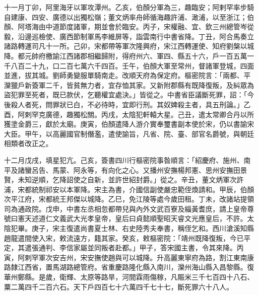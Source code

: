 \begin{pinyinscope}
 十一月丁卯，阿里海牙以軍攻潭州。乙亥，伯顏分軍為三，趣臨安；阿剌罕率步騎自建康、四安、廣德以出獨松嶺；董文炳率舟師循海趣許浦、澉浦，以至浙江；伯顏、阿塔海由中道節度諸軍，期並會於臨安。丙子，宋權融、宜、欽三州總管岑從毅，沿邊巡檢使、廣西節制軍馬李維屏等，詣雲南行中書省降。丁丑，阿合馬奏立諸路轉運司凡十一所。己卯，宋都帶等軍次隆興府，宋江西轉運使、知府劉槃以城降。都元帥府檄諭江西諸郡相繼歸附，得府州六、軍四、縣五十六，戶一百五萬一千八百二十九，口二百七萬六千四百。壬午，伯顏大軍至常州，督諸軍登城，四面並進，拔其城。劉師勇變服單騎南走。改順天府為保定府。樞密院言：「兩都、平灤獵戶新簽軍二千，皆貧無力者，宜存恤其家。又新附郡縣有既降復叛，及糾眾為盜犯罪至死者，既已款伏，乞聽權宜處決。」皆從之。中書省臣議斷死罪，詔：「今後殺人者死，問罪狀已白，不必待時，宜即行刑。其奴婢殺主者，具五刑論。」乙酉，阿剌罕克廣德，趣獨松關。丙戌，太陰犯軒轅大星。己丑，遣太常卿合丹以所獲塗金爵三，獻於太廟。庚寅，伯顏遣降人游介實奉璽書副本使於宋，仍以書諭宋大臣。甲午，以高麗國官制僭濫，遣使諭旨，凡省、院、臺、部官名爵號，與朝廷相類者改正之。



 十二月戊戌，填星犯亢。己亥，簽書四川行樞密院事昝順言：「紹慶府、施州、南平及諸蠻呂告、馬蒙、阿永等，有向化之心。又播州安撫楊邦憲、思州安撫田景賢，未知逆順，乞降詔使之自新，並許世紹封爵。」從之。辛丑，董文炳軍次許浦，宋都統制祁安以本軍降。宋主為書，介國信副使嚴忠範侄煥請和。甲辰，伯顏次平江府，宋都統王邦傑以城降。乙巳，免江陵等處今歲田租。丁未，改諸站提領司為通政院。戊申，中書左丞相忽都帶兒與內外文武百寮及緇黃耆庶，請上皇帝尊號曰憲天述道仁文義武大光孝皇帝，皇后曰貞懿順聖昭天睿文光應皇后，不許。太陰犯畢。庚子，宋主復遣尚書夏士林、右史陸秀夫奉書，稱侄乞和。西川滄溪知縣趙龍遣間使入宋，敕流遠方，籍其家。癸亥，敕樞密院：「靖州既降復叛，今已平定，其遣張通判、李信家屬並同叛者赴都。」甲子，答宋國主書，令其來降。丙寅，阿剌罕軍次安吉州，宋安撫使趙與可以城降。升高麗東寧府為路，割江東南康路隸江西省，置馬湖路總管府。省重慶路隆化縣入南川，灤州海山縣入昌黎縣。復華州鄭縣。是歲，衛輝、太原等路旱，河間霖雨傷稼，凡賑米三千七百四十八石、粟二萬四千二百六石。天下戶四百七十六萬四千七十七，斷死罪六十八人。



\end{pinyinscope}